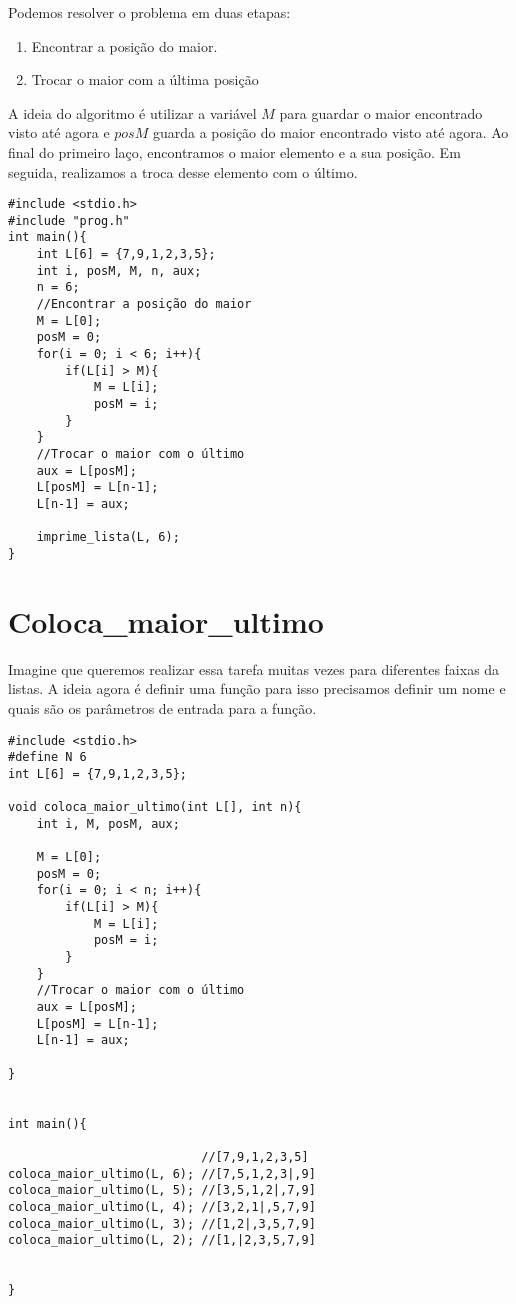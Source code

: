 \documentclass[a4paper,11pt]{article}
\begin{document}
Podemos resolver o problema em duas etapas:

\begin{enumerate}
    \item Encontrar a posição do maior.
    \item Trocar o maior com a última posição
\end{enumerate}

A ideia do algoritmo é utilizar a variável $M$ para guardar o maior encontrado visto até agora e $posM$ guarda a posição do maior encontrado visto até agora. Ao final do primeiro laço, encontramos o maior elemento e a sua posição. Em seguida, realizamos a troca desse elemento com o último.



\begin{verbatim}
#include <stdio.h>
#include "prog.h"
int main(){
	int L[6] = {7,9,1,2,3,5}; 
	int i, posM, M, n, aux;
	n = 6;
	//Encontrar a posição do maior
	M = L[0];
	posM = 0;
	for(i = 0; i < 6; i++){
		if(L[i] > M){
			M = L[i];
			posM = i;
		}
	}
	//Trocar o maior com o último
	aux = L[posM];
	L[posM] = L[n-1];
	L[n-1] = aux;
	
	imprime_lista(L, 6);
}
\end{verbatim}

\newpage 


\section*{Coloca\_maior\_ultimo}

Imagine que queremos realizar essa tarefa muitas vezes para diferentes faixas da listas. A ideia agora é definir uma função para isso precisamos definir um nome e quais são os parâmetros de entrada para a função.

\begin{verbatim}
#include <stdio.h>
#define N 6
int L[6] = {7,9,1,2,3,5}; 

void coloca_maior_ultimo(int L[], int n){
	int i, M, posM, aux;
	
	M = L[0];
	posM = 0;
	for(i = 0; i < n; i++){
		if(L[i] > M){
			M = L[i];
			posM = i;
		}
	}
	//Trocar o maior com o último
	aux = L[posM];
	L[posM] = L[n-1];
	L[n-1] = aux;

}


int main(){

                           //[7,9,1,2,3,5]   
coloca_maior_ultimo(L, 6); //[7,5,1,2,3|,9]
coloca_maior_ultimo(L, 5); //[3,5,1,2|,7,9]
coloca_maior_ultimo(L, 4); //[3,2,1|,5,7,9]
coloca_maior_ultimo(L, 3); //[1,2|,3,5,7,9]
coloca_maior_ultimo(L, 2); //[1,|2,3,5,7,9]
 
		
}
\end{verbatim}
\end{document}
